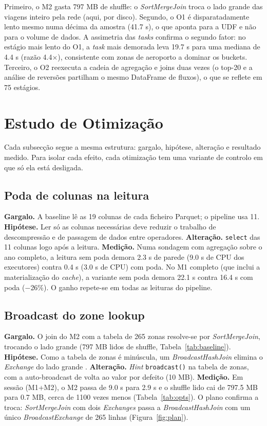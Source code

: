 \documentclass[sigconf]{acmart}
\begin{document}
Primeiro, o M2 gasta 797 MB de shuffle: o \emph{SortMergeJoin} troca o
lado grande das viagens inteiro pela rede (aqui, por disco). Segundo, o
O1 é disparatadamente lento mesmo numa décima da amostra (41.7 s), o
que aponta para a UDF e não para o volume de dados. A assimetria das
\emph{tasks} confirma o segundo fator: no estágio mais lento do O1, a
\emph{task} mais demorada leva 19.7 s para uma mediana de 4.4 s (razão
4.4$\times$), consistente com zonas de aeroporto a dominar os buckets.
Terceiro, o O2 reexecuta a cadeia de agregação e joins duas vezes (o
top-20 e a análise de reversões partilham o mesmo DataFrame de fluxos),
o que se reflete em 75 estágios.

\section{Estudo de Otimização}

Cada subsecção segue a mesma estrutura: gargalo, hipótese, alteração e
resultado medido. Para isolar cada efeito, cada otimização tem uma
variante de controlo em que só ela está desligada.

\subsection{Poda de colunas na leitura}

\textbf{Gargalo.} A baseline lê as 19 colunas de cada ficheiro Parquet;
o pipeline usa 11. \textbf{Hipótese.} Ler só as colunas necessárias deve
reduzir o trabalho de descompressão e de passagem de dados entre
operadores. \textbf{Alteração.} \texttt{select} das 11 colunas logo após
a leitura. \textbf{Medição.} Numa sondagem com agregação sobre o ano
completo, a leitura sem poda demora 2.3 s de parede (9.0 s de CPU dos
executores) contra 0.4 s (3.0 s de CPU) com poda. No M1 completo (que
inclui a materialização do \emph{cache}), a variante sem poda demora
22.1 s contra 16.4 s com poda ($-$26\%). O ganho repete-se em todas as
leituras do pipeline.

\subsection{Broadcast do zone lookup}

\textbf{Gargalo.} O join do M2 com a tabela de 265 zonas resolve-se por
\emph{SortMergeJoin}, trocando o lado grande (797 MB lidos de shuffle,
Tabela~\ref{tab:baseline}). \textbf{Hipótese.} Como a tabela de zonas é
minúscula, um \emph{BroadcastHashJoin} elimina o \emph{Exchange} do lado
grande \cite{sparkdocs}. \textbf{Alteração.} \emph{Hint} \texttt{broadcast()} na tabela
de zonas, com a auto-broadcast de volta ao valor por defeito (10 MB).
\textbf{Medição.} Em sessão (M1+M2), o M2 passa de 9.0 s para 2.9 s e o
shuffle lido cai de 797.5 MB para 0.7 MB, cerca de 1100 vezes menos
(Tabela~\ref{tab:opts}). O plano confirma a troca: \emph{SortMergeJoin}
com dois \emph{Exchanges} passa a \emph{BroadcastHashJoin} com um único
\emph{BroadcastExchange} de 265 linhas (Figura~\ref{fig:plan}).
\end{document}
